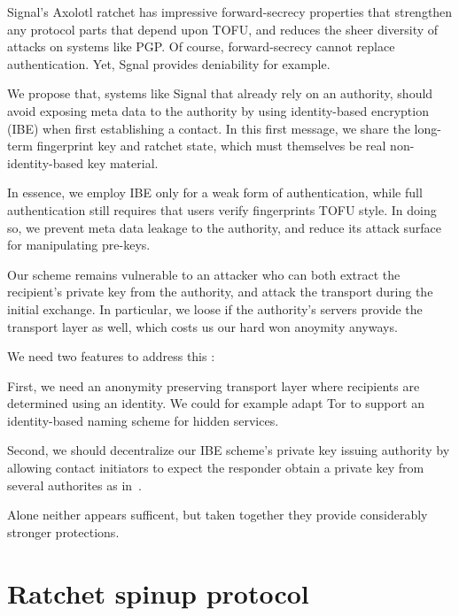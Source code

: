 \documentclass[twoside,letterpaper]{sig-alternate}
\begin{document}
Signal's Axolotl ratchet has impressive forward-secrecy properties
that strengthen any protocol parts that depend upon TOFU, and
reduces the sheer diversity of attacks on systems like PGP.
Of course, forward-secrecy cannot replace authentication.
Yet, Sgnal provides deniability for example.

\smallskip

We propose that, systems like Signal that already rely on an authority,
should avoid exposing meta data to the authority by using
identity-based encryption (IBE) when first establishing a contact.
In this first message, we share the long-term fingerprint key and
ratchet state, which must themselves be real non-identity-based key
material. 

In essence, we employ IBE only for a weak form of authentication, 
while full authentication still requires that users verify fingerprints
TOFU style.
In doing so, we prevent meta data leakage to the authority, and reduce
its attack surface for manipulating pre-keys.  

Our scheme remains vulnerable to an attacker who can both
 extract the recipient's private key from the authority, and
 attack the transport during the initial exchange.  
In particular, we loose if the authority's servers provide the transport
layer as well, which costs us our hard won anoymity anyways. 

We need two features to address this :

First, we need an anonymity preserving transport layer where recipients
are determined using an identity.  We could for example adapt Tor to
support an identity-based naming scheme for hidden services.  

Second, we should decentralize our IBE scheme's private key issuing
authority by allowing contact initiators to expect the responder
obtain a private key from several authorites as in~\cite{}. 

Alone neither appears sufficent, but taken together they provide 
considerably stronger protections. 


\section{Ratchet spinup protocol}

\def\E{\mathbb{E}}
\def\F{\mathbb{F}}
\def\Z{\mathbb{Z}}
\def\ID{\mathtt{ID}}
\def\rk{\mathtt{rk}}
\def\ck{\mathtt{ck}}
\def\mk{\mathtt{mk}}
\end{document}
